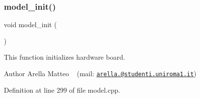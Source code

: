 \subsubsection{\texorpdfstring{model\+\_\+init()}{model\_init()}}
{\footnotesize\ttfamily void model\+\_\+init (\begin{DoxyParamCaption}{ }\end{DoxyParamCaption})}



This function initializes hardware board. 

\begin{DoxyAuthor}{Author}
Arella Matteo ~\newline
 (mail\+: \href{mailto:arella.1646983@studenti.uniroma1.it}{\tt arella.@studenti.\+uniroma1.\+it}) 
\end{DoxyAuthor}


Definition at line 299 of file model.\+cpp.

